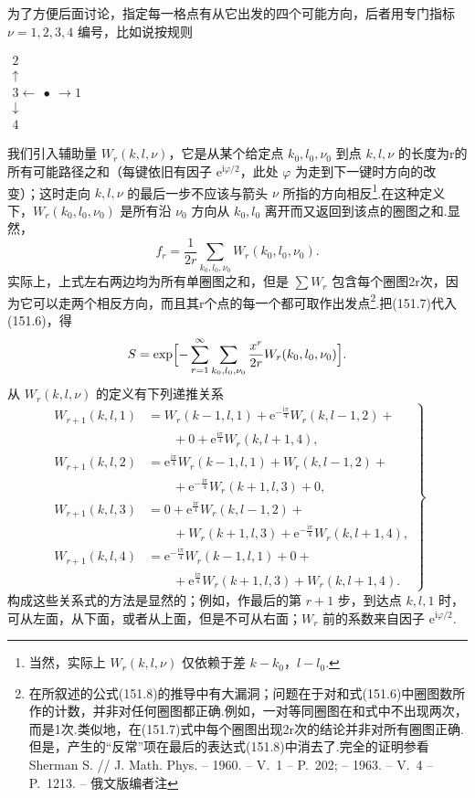 为了方便后面讨论，指定每一格点有从它出发的四个可能方向，后者用专门指标 $\nu=1,2,3,4$ 编号，比如说按规则
\begin{center}
$\begin{array}{c}
  2\\
  \uparrow\\
  3\leftarrow\ \bullet\ \rightarrow 1\\
  \downarrow\\
  4
\end{array}$
\end{center}
我们引入辅助量 $W_r(k,l,\nu)$，它是从某个给定点 $k_0,l_0,\nu_0$ 到点 $k,l,\nu$ 的长度为r的所有可能路径之和（每键依旧有因子 $\mathrm{e}^{\mathrm{i}\varphi/2}$，此处 $\varphi$ 为走到下一键时方向的改变）；这时走向 $k,l,\nu$ 的最后一步不应该与箭头 $\nu$ 所指的方向相反\footnote{当然，实际上 $W_r(k,l,\nu)$ 仅依赖于差 $k-k_0$，$l-l_0$.}.在这种定义下，$W_r(k_0,l_0,\nu_0)$ 是所有沿 $\nu_0$ 方向从 $k_0,l_0$ 离开而又返回到该点的圈图之和.显然，
\begin{equation}
  f_r=\frac{1}{2r}\sum_{k_0,l_0,\nu_0}W_r(k_0,l_0,\nu_0).
\end{equation}
实际上，上式左右两边均为所有单圈图之和，但是 $\sum W_r$ 包含每个圈图2r次，因为它可以走两个相反方向，而且其r个点的每一个都可取作出发点\footnote{在所叙述的公式(151.8)的推导中有大漏洞；问题在于对和式(151.6)中圈图数所作的计数，并非对任何圈图都正确.例如，一对等同圈图在和式中不出现两次，而是1次.类似地，在(151.7)式中每个圈图出现2r次的结论并非对所有圈图正确.但是，产生的“反常”项在最后的表达式(151.8)中消去了.完全的证明参看 Sherman S. // J. Math. Phys. – 1960. – V.~1 – P.~202; – 1963. – V.~4 – P.~1213. – 俄文版编者注}.把(151.7)代入(151.6)，得
\begin{equation}
  S=\exp\Bigl[-\sum_{r=1}^{\infty}\sum_{k_0,l_0,\nu_0}
  \frac{x^r}{2r}W_r(k_0,l_0,\nu_0)\Bigr].
\end{equation}
从 $W_r(k,l,\nu)$ 的定义有下列递推关系
\begin{equation}
\left.\begin{aligned}
  W_{r+1}(k,l,1)&=W_r(k-1,l,1)+\mathrm{e}^{-\frac{\mathrm{i}\pi}{4}}
  W_r(k,l-1,2)+{}\\
  &\qquad+0+\mathrm{e}^{\frac{\mathrm{i}\pi}{4}}W_r(k,l+1,4),\\
  W_{r+1}(k,l,2)&=\mathrm{e}^{\frac{\mathrm{i}\pi}{4}}W_r(k-1,l,1)
  +W_r(k,l-1,2)+{}\\
  &\qquad+\mathrm{e}^{-\frac{\mathrm{i}\pi}{4}}W_r(k+1,l,3)+0,\\
  W_{r+1}(k,l,3)&=0+\mathrm{e}^{\frac{\mathrm{i}\pi}{4}}W_r(k,l-1,2)+{}\\
  &\qquad+W_r(k+1,l,3)+\mathrm{e}^{-\frac{\mathrm{i}\pi}{4}}W_r(k,l+1,4),\\
  W_{r+1}(k,l,4)&=\mathrm{e}^{-\frac{\mathrm{i}\pi}{4}}W_r(k-1,l,1)+0+{}\\
  &\qquad+\mathrm{e}^{\frac{\mathrm{i}\pi}{4}}W_r(k+1,l,3)
  +W_r(k,l+1,4).
\end{aligned}\right\}
\end{equation}
构成这些关系式的方法是显然的；例如，作最后的第 $r+1$ 步，到达点 $k,l,1$ 时，可从左面，从下面，或者从上面，但是不可从右面；$W_r$ 前的系数来自因子 $\mathrm{e}^{\mathrm{i}\varphi/2}$.

